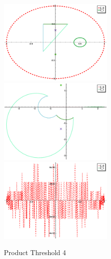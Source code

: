 \documentclass[a4paper,10pt]{article}
\begin{document}
\graphicspath{{./GE1LE0PT4/}}
\begin{figure}
\caption{Product Threshold 4}
\includegraphics[width=0.5\textwidth]{circle_plot.eps}
\includegraphics[width=0.5\textwidth]{zedplot.eps}
\includegraphics[width=0.5\textwidth]{zedplot_C0.eps}
\end{figure}
\end{document}
